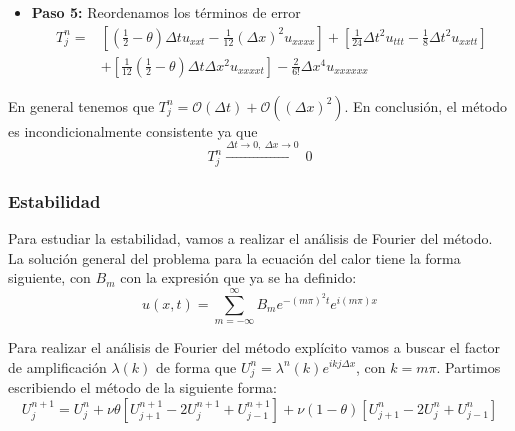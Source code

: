 \documentclass[spanish]{mathnotes}
\begin{document}
\begin{itemize}
			\item \textbf{Paso 5: }	Reordenamos los términos de error
			\begin{align*}
			T_j^n = & \left[\left(\frac{1}{2}-\theta\right)\Delta t u_{xxt}- \frac{1}{12}(\Delta x)^2 u_{xxxx}\right]
			+ \left[\frac{1}{24}\Delta t^2 u_{ttt}-\frac{1}{8}\Delta t ^2 u_{xxtt}\right]\\
			& + \left[\frac{1}{12}\left(\frac{1}{2}-\theta\right)\Delta t \Delta x^2 u_{xxxxt}\right] - \frac{2}{6!}\Delta x ^4 u_{xxxxxx}
			\end{align*}
			\end{itemize}
			
			En general tenemos que $T_j^n = \mathcal{O}(\Delta t) + \mathcal{O}\left((\Delta x)^2\right)$. En conclusión, el método es incondicionalmente consistente ya que 
			$$T_j^n  \scriptstyle{\xrightarrow{\Delta t\to0,\ \Delta x \to 0}} \textstyle\ 0$$
			
			\subsubsection{Estabilidad}
			Para estudiar la estabilidad, vamos a realizar el análisis de Fourier del método. La solución general del problema para la ecuación del calor tiene la forma siguiente, con $B_m$ con la expresión que ya se ha definido:
			$$u(x,t) = \sum_{m=-\infty}^\infty B_m e^{-(m\pi)^2 t}e^{i(m\pi)x}$$
			
			Para realizar el análisis de Fourier del método explícito vamos a buscar el factor de amplificación $\lambda(k)$ de forma que $U_j^n = \lambda^n(k)e^{ikj\Delta x}$, con $k=m\pi$. Partimos escribiendo el método de la siguiente forma:
			$$U_j^{n+1} = U_j^n + \nu\theta\left[U_{j+1}^{n+1} - 2U_{j}^{n+1} + U_{j-1}^{n+1}\right] + \nu(1-\theta)\left[U_{j+1}^{n}-2U_{j}^{n}+U_{j-1}^{n}\right]$$
			
\end{document}
